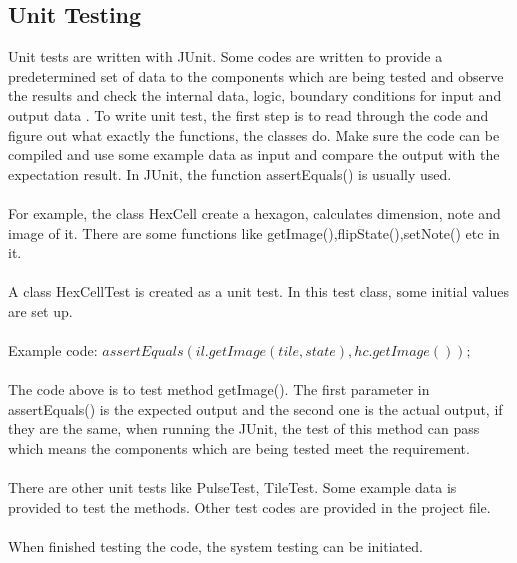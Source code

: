\documentclass[10pt,a4paper]{article}
\begin{document}
\subsection{Unit Testing}
Unit tests are written with JUnit. Some codes are written to provide a predetermined set of data to the components which are being tested and observe the results and check the internal data, logic, boundary conditions for input and output data \cite{SEP}. To write unit test, the first step is to read through the code and figure out what exactly the functions, the classes do. Make sure the code can be compiled and use some example data as input and compare the output with the expectation result. In JUnit, the function assertEquals() is usually used.\\
\\
For example, the class HexCell create a hexagon, calculates dimension, note and image of it. There are some functions like getImage(),flipState(),setNote() etc in it.\\
\\
A class HexCellTest is created as a unit test. In this test class, some initial values are set up.\\
\\
Example code: $ assertEquals(il.getImage(tile, state), hc.getImage()); $\\
\\
The code above is to test method getImage(). The first parameter in assertEquals() is the expected output and the second one is the actual output, if they are the same, when running the JUnit, the test of this method can pass which means the components which are being tested meet the requirement.\\
\\
There are other unit tests like PulseTest, TileTest. Some example data is provided to test the methods. Other test codes are provided in the project file.\\
\\
When finished testing the code, the system testing can be initiated. 
\end{document}
